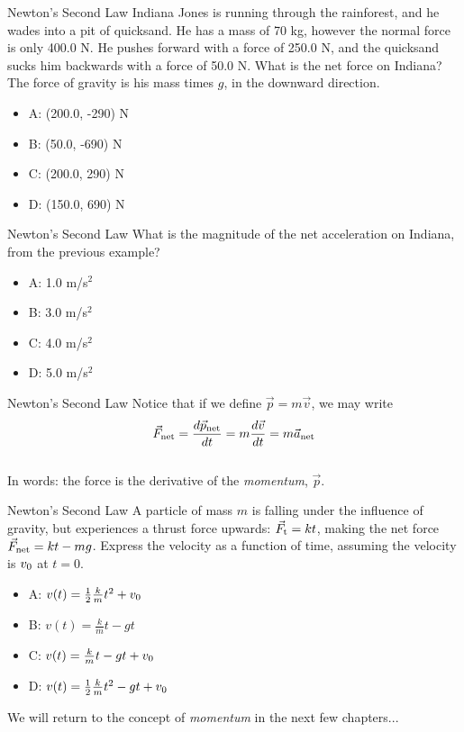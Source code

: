 \documentclass{beamer}
\begin{document}
\begin{frame}{Newton's Second Law}
Indiana Jones is running through the rainforest, and he wades into a pit of quicksand.  He has a mass of 70 kg, however the normal force is only 400.0 N.  He pushes forward with a force of 250.0 N, and the quicksand sucks him backwards with a force of 50.0 N.  What is the net force on Indiana?  The force of gravity is his mass times $g$, in the downward direction.
\begin{itemize}
\item A: (200.0, -290) N
\item B: (50.0, -690) N
\item C: (200.0, 290) N
\item D: (150.0, 690) N
\end{itemize}
\end{frame}

\begin{frame}{Newton's Second Law}
What is the magnitude of the net acceleration on Indiana, from the previous example?
\begin{itemize}
\item A: 1.0 m/s$^2$
\item B: 3.0 m/s$^2$
\item C: 4.0 m/s$^2$
\item D: 5.0 m/s$^2$
\end{itemize}
\end{frame}

\begin{frame}{Newton's Second Law}
Notice that if we define $\vec{p} = m\vec{v}$, we may write \\
\vspace{0.5cm}
\begin{equation}
\vec{F}_{\rm net} = \frac{d\vec{p}_{\rm net}}{dt} = m \frac{d\vec{v}}{dt} = m \vec{a}_{\rm net}
\end{equation} \\
\vspace{0.5cm}
In words: the force is the derivative of the \textit{momentum}, $\vec{p}$.
\end{frame}

\begin{frame}{Newton's Second Law}
A particle of mass $m$ is falling under the influence of gravity, but experiences a thrust force upwards: $\vec{F}_{\rm t} = kt$, making the net force $\vec{F}_{\rm net} = kt - mg$.  Express the velocity as a function of time, assuming the velocity is $v_{\rm 0}$ at $t=0$.
\begin{itemize}
\item A: $v(t) = \frac{1}{2} \frac{k}{m} t^2+v_{\rm 0}$
\item B:  $v(t) = \frac{k}{m} t - gt$
\item C:  $v(t) = \frac{k}{m} t - gt +v_{\rm 0}$
\item D: $v(t) = \frac{1}{2} \frac{k}{m} t^2 - gt +v_{\rm 0}$
\end{itemize}
\vspace{0.5cm}
We will return to the concept of \textit{momentum} in the next few chapters...
\end{frame}
\end{document}

